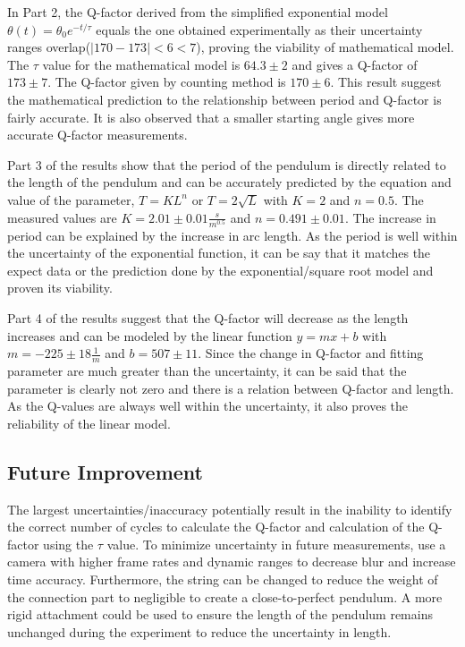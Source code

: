 \documentclass[11pt,titlepage,a4paper,twocolumn]{article}
\begin{document}
        In Part 2, the Q-factor derived from the simplified exponential model $\theta(t) = \theta_0 e^{-t/\tau}$ equals the one obtained experimentally as their uncertainty ranges overlap($|170 - 173| < 6 < 7$), proving the viability of mathematical model. The $\tau$ value for the mathematical model  is $64.3 \pm 2$ and gives a Q-factor of $173 \pm 7$. The Q-factor given by counting method is $170 \pm 6$. This result suggest the mathematical prediction to the relationship between period and Q-factor is fairly accurate. It is also observed that a smaller starting angle gives more accurate Q-factor measurements.
        
        Part 3 of the results show that the period of the pendulum is directly related to the length of the pendulum and can be accurately predicted by the equation and value of the parameter, $T = KL^n$ or $T = 2\sqrt{L}$ with $K=2$ and $ n=0.5$. The measured values are $K = 2.01 \pm 0.01\frac{s}{m^{0.5}}$ and $n = 0.491 \pm 0.01$. The increase in period can be explained by the increase in arc length. As the period is well within the uncertainty of the exponential function, it can be say that it matches the expect data or the prediction done by the exponential/square root model and proven its viability. 
        
        Part 4 of the results suggest that the Q-factor will decrease as the length increases and can be modeled by the linear function $y = mx + b$ with $m = -225 \pm 18\frac{1}{m}$ and $b = 507 \pm 11$. Since the change in Q-factor and fitting parameter are much greater than the uncertainty, it can be said that the parameter is clearly not zero and there is a relation between Q-factor and length. As the Q-values are always well within the uncertainty, it also proves the reliability of the linear model.
        
    \subsection{Future Improvement}
        \hspace{\parindent}\hspace{\parindent}The largest uncertainties/inaccuracy potentially result in the inability to identify the correct number of cycles to calculate the Q-factor and calculation of the Q-factor using the $\tau$ value. To minimize uncertainty in future measurements, use a camera with higher frame rates and dynamic ranges to decrease blur and increase time accuracy. Furthermore, the string can be changed to reduce the weight of the connection part to negligible to create a close-to-perfect pendulum. A more rigid attachment could be used to ensure the length of the pendulum remains unchanged during the experiment to reduce the uncertainty in length.
\end{document}
